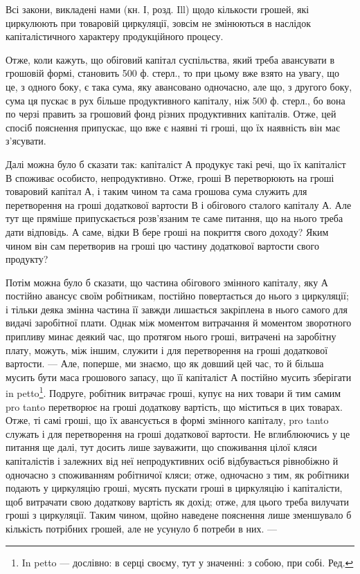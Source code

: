 Всі закони, викладені нами (кн. І, розд. Ill) щодо кількости грошей,
які циркулюють при товаровій циркуляції, зовсім не змінюються в наслідок
капіталістичного характеру продукційного процесу.

Отже, коли кажуть, що обіговий капітал суспільства, який треба
авансувати в грошовій формі, становить 500 ф. стерл., то при цьому вже
взято на увагу, що це, з одного боку, є така сума, яку авансовано одночасно,
але що, з другого боку, сума ця пускає в рух більше продуктивного
капіталу, ніж 500 ф. стерл., бо вона по черзі править за грошовий
фонд різних продуктивних капіталів. Отже, цей спосіб пояснення
припускає, що вже є наявні ті гроші, що їх наявність він має з’ясувати.

Далі можна було б сказати так: капіталіст А продукує такі речі, що
їх капіталіст В споживає особисто, непродуктивно. Отже, гроші В перетворюють
на гроші товаровий капітал А, і таким чином та сама грошова
сума служить для перетворення на гроші додаткової вартости В і
обігового сталого капіталу А. Але тут ще пряміше припускається розв’язаним
те саме питання, що на нього треба дати відповідь. А саме, відки
В бере гроші на покриття свого доходу? Яким чином він сам перетворив
на гроші цю частину додаткової вартости свого продукту?

Потім можна було б сказати, що частина обігового змінного капіталу,
яку А постійно авансує своїм робітникам, постійно повертається до нього
з циркуляції; і тільки деяка змінна частина її завжди лишається закріплена
в нього самого для видачі заробітної плати. Однак між моментом
витрачання й моментом зворотного припливу минає деякий час, що
протягом нього гроші, витрачені на заробітну плату, можуть, між іншим,
служити і для перетворення на гроші додаткової вартости. — Але, поперше,
ми знаємо, що як довший цей час, то й більша мусить бути маса грошового
запасу, що її капіталіст А постійно мусить зберігати in petto\footnote*{
In petto — дослівно: в серці своєму, тут у значенні: з собою, при собі. Ред.
}.
Подруге, робітник витрачає гроші, купує на них товари й тим самим
pro tanto перетворює на гроші додаткову вартість, що міститься в цих
товарах. Отже, ті самі гроші, що їх авансується в формі змінного капіталу,
pro tanto служать і для перетворення на гроші додаткової вартости.
Не вглиблюючись у це питання ще далі, тут досить лише зауважити, що
споживання цілої кляси капіталістів і залежних від неї непродуктивних
осіб відбувається рівнобіжно й одночасно з споживанням робітничої кляси;
отже, одночасно з тим, як робітники подають у циркуляцію гроші,
мусять пускати гроші в циркуляцію і капіталісти, щоб витрачати свою
додаткову вартість як дохід; отже, для цього треба вилучати гроші з
циркуляції. Таким чином, щойно наведене пояснення лише зменшувало б
кількість потрібних грошей, але не усунуло б потреби в них. —

